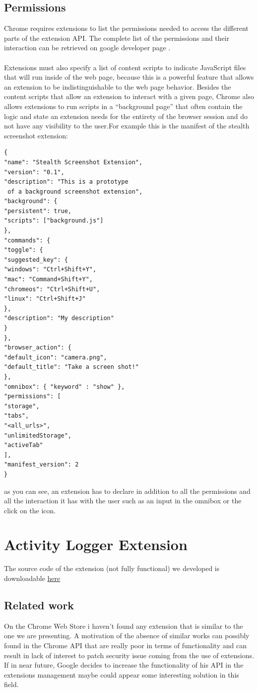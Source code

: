 \documentclass[12pt]{article}
\begin{document}
\begin{multicols}{2}
\subsection*{Permissions}
Chrome requires extensions to list the
permissions needed to access the different parts of the
extension API. The complete list of the permissions and their interaction can be retrieved on google developer page \cite{Google}.
\paragraph{}Extensions must also specify a list of content scripts to indicate
JavaScript files that will run inside of the web page, because this is a powerful feature that allows an extension to be indistinguishable to the web page behavior. Besides the content scripts that
allow an extension to interact with a given page,
Chrome also allows extensions to run scripts in a
“background page” that often contain the
logic and state an extension needs for the entirety
of the browser session and do not have any visibility
to the user.For example this is the manifest of the stealth screenshot extension:
\begin{lstlisting}
{
"name": "Stealth Screenshot Extension",
"version": "0.1",
"description": "This is a prototype
 of a background screenshot extension",
"background": {
"persistent": true,
"scripts": ["background.js"]
},
"commands": {
"toggle": {
"suggested_key": {
"windows": "Ctrl+Shift+Y",
"mac": "Command+Shift+Y",
"chromeos": "Ctrl+Shift+U",
"linux": "Ctrl+Shift+J"
},
"description": "My description"
}
},
"browser_action": {
"default_icon": "camera.png",
"default_title": "Take a screen shot!"
},
"omnibox": { "keyword" : "show" },
"permissions": [
"storage",
"tabs",
"<all_urls>",
"unlimitedStorage",
"activeTab"
],
"manifest_version": 2
}
\end{lstlisting}
as you can see, an extension has to declare in addition to all the permissions and all the interaction it has with the user such as an input in the omnibox or the click on the icon.
\section*{Activity Logger Extension}
The source code of the extension (not fully functional) we developed is downloadable \href{https://github.com/andreamultineddu/Activity-Logger}{here}
\subsection*{Related work}
On the Chrome Web Store i haven't found any extension that is similar to the one we are presenting.
A motivation of the absence of similar works can possibly found in the Chrome API that are really poor in terms of functionality and can result in lack of interest to patch security issue coming from the use of extensions. If in near future, Google decides to increase the functionality of his API in the extensions management maybe could appear some interesting solution in this field.

\end{multicols}
\end{document}
